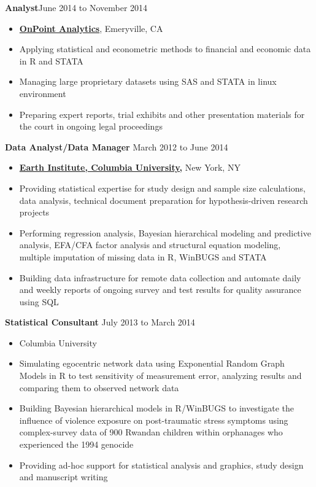 \documentclass[11pt]{article}
\newenvironment{innerlist}[1][\enskip\textbullet]%
        {\begin{itemize}[#1,leftmargin=*,parsep=0pt,itemsep=0pt,topsep=0pt,partopsep=0pt]}
        {\end{itemize}}
\begin{document}
\textbf{Analyst}\hfill{June 2014 to November 2014}
\begin{innerlist}
\item[] \href{http://www.onpointanalytics.com}{\textbf{OnPoint Analytics}}, Emeryville, CA\\
\item Applying statistical and econometric methods to financial and economic data in R and STATA
\item Managing large proprietary datasets using SAS and STATA in linux environment
\item Preparing expert reports, trial exhibits and other presentation materials for the court in ongoing legal proceedings\\

\end{innerlist}

\textbf{Data Analyst/Data Manager} \hfill {March 2012 to June 2014}
\begin{innerlist}
\item[] \href{http://www.ei.columbia.edu}{\textbf{Earth Institute, Columbia University,}} New York, NY\\
\item Providing statistical expertise for study design and sample size calculations, data analysis, technical document preparation for hypothesis-driven research projects
\item Performing regression analysis, Bayesian hierarchical modeling and predictive analysis, EFA/CFA factor analysis and structural equation modeling, multiple imputation of missing data in R, WinBUGS and STATA
\item Building data infrastructure for remote data collection and automate daily and weekly reports of ongoing survey and test results for quality assurance using SQL\\
\end{innerlist}

\textbf{Statistical Consultant} \hfill {July 2013 to March 2014}
\begin{innerlist}
\item[] Columbia University\\
\item Simulating egocentric network data using Exponential Random Graph Models in R to test sensitivity of measurement error, analyzing results and comparing them to observed network data
\item Building Bayesian hierarchical models in R/WinBUGS to investigate the influence of violence exposure on post-traumatic stress symptoms using complex-survey data of 900 Rwandan children within orphanages who experienced the 1994 genocide
\item Providing ad-hoc support for statistical analysis and graphics, study design and manuscript writing\\
\end{innerlist}
\end{document}
